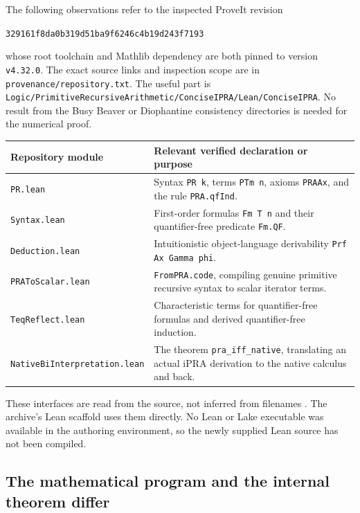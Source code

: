 \documentclass[11pt]{article}
\theoremstyle{definition}
\newcommand{\repo}{\texttt{329161f8da0b319d51ba9f6246c4b19d243f7193}}
\begin{document}
The following observations refer to the inspected ProveIt revision
\begin{center}\small\repo\end{center}
whose root toolchain and Mathlib dependency are both pinned to version
\texttt{v4.32.0}. The exact source links and inspection scope are in
\texttt{provenance/repository.txt}. The useful part is
\texttt{Logic/PrimitiveRecursiveArithmetic/ConciseIPRA/Lean/ConciseIPRA}.
No result from the Busy Beaver or Diophantine consistency directories is
needed for the numerical proof.

\begin{center}
\begin{tabular}{@{}p{}p{}@{}}
\toprule
Repository module & Relevant verified declaration or purpose\\
\midrule
\texttt{PR.lean} & Syntax \texttt{PR k}, terms \texttt{PTm n}, axioms
\texttt{PRAAx}, and the rule \texttt{PRA.qfInd}.\\[4pt]
\texttt{Syntax.lean} & First-order formulas \texttt{Fm T n} and their
quantifier-free predicate \texttt{Fm.QF}.\\[4pt]
\texttt{Deduction.lean} & Intuitionistic object-language derivability
\texttt{Prf Ax Gamma phi}.\\[4pt]
\texttt{PRAToScalar.lean} & \texttt{FromPRA.code}, compiling genuine
primitive recursive syntax to scalar iterator terms.\\[4pt]
\texttt{TeqReflect.lean} & Characteristic terms for quantifier-free
formulas and derived quantifier-free induction.\\[4pt]
\texttt{NativeBiInterpretation.lean} & The theorem
\texttt{pra\_iff\_native}, translating an actual iPRA derivation to
the native calculus and back.\\
\bottomrule
\end{tabular}
\end{center}

These interfaces are read from the source, not inferred from filenames
\cite{ProveItPR,ProveItNative}. The archive's Lean scaffold uses them
directly. No Lean or Lake executable was available in the authoring
environment, so the newly supplied Lean source has not been compiled.

\subsection{The mathematical program and the internal theorem differ}
\end{document}

